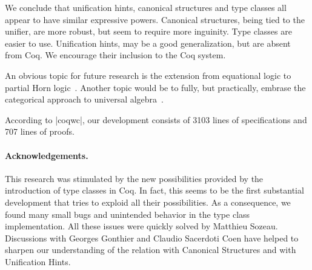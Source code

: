\documentclass[a4paper,10pt, runningheads]{llncs}
\begin{document}
We conclude that unification hints, canonical structures and type classes all appear to have
similar expressive powers. Canonical structures, being tied to the unifier, are more robust, but
seem to require more inguinity. Type classes are easier to use. Unification hints, may be a
good generalization, but are absent from Coq. We encourage their inclusion to the
Coq system.

An obvious topic for future research is the extension from equational logic to partial Horn
logic~\cite{palmgren2007partial}. Another topic would be to fully, but practically, embrase the
categorical approach to universal algebra~\cite{pitts2001categorical}.

According to |coqwc|, our development consists of 3103 lines of specifications and 707 lines of
proofs.


% 

\paragraph{Acknowledgements.}
This research was stimulated by the new possibilities provided by the introduction of type classes
in Coq. In fact, this seems to be the first substantial development that tries to exploid all their
possibilities. As a consequence, we found many small bugs and unintended behavior in the type
class implementation. All these issues were quickly solved by Matthieu Sozeau. Discussions with
Georges Gonthier and Claudio Sacerdoti Coen have helped to
sharpen our understanding of the relation with Canonical Structures and with Unification Hints.


\end{document}
